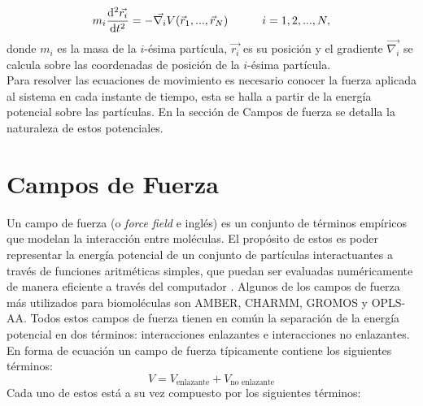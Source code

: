 \begin{equation}\label{eq:1}
m_i\frac{\mathrm{d}^2\vec{r_i}}{\mathrm{d}t^2}=-\vec{\nabla_i}V(\vec{r}_1,...,\vec{r}_N) \text{\hspace{30pt}}i=1,2,...,N,
\end{equation}
donde $m_i$ es la masa de la $i$-\'{e}sima part\'{i}cula, $\vec{r_i}$ es su posici\'{o}n y el gradiente $ \vec{\nabla_i}$ se calcula sobre las coordenadas de posici\'{o}n de la $i$-\'{e}sima part\'{i}cula.\\

Para resolver las ecuaciones de movimiento es necesario conocer la fuerza aplicada al sistema en cada instante de tiempo, esta se halla a partir de la energ\'{i}a potencial sobre las part\'{i}culas. En la secci\'{o}n de Campos de fuerza se detalla la naturaleza de estos potenciales.
\section{Campos de Fuerza}
Un campo de fuerza (o \textit{force field} e ingl\'{e}s) es un conjunto de t\'{e}rminos emp\'{i}ricos que modelan la interacci\'{o}n entre mol\'{e}culas. El prop\'{o}sito de estos es poder representar la energ\'{i}a potencial de un conjunto de part\'{i}culas interactuantes a trav\'{e}s de funciones aritm\'{e}ticas simples, que puedan ser evaluadas num\'{e}ricamente de manera eficiente a trav\'{e}s del computador \cite{Kukol2014MolecularEdition}. Algunos de los campos de fuerza m\'{a}s utilizados para biomol\'{e}culas son AMBER, CHARMM, GROMOS y OPLS-AA. Todos estos campos de fuerza tienen en com\'{u}n la separaci\'{o}n de la energ\'{i}a potencial en dos t\'{e}rminos: interacciones enlazantes e interacciones no enlazantes. En forma de ecuaci\'{o}n un campo de fuerza t\'{i}picamente contiene los siguientes t\'{e}rminos:
\begin{equation}\label{eq:5}
    V=V_{\text{enlazante}}+V_{\text{no enlazante}}
\end{equation}
Cada uno de estos est\'{a} a su vez compuesto por los siguientes t\'{e}rminos:
